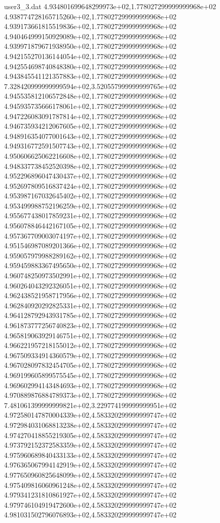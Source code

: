 \begin{filecontents}{user3_3.dat}
4.934801699648299973e+02,1.778027299999999968e+02
4.938774728165715260e+02,1.778027299999999968e+02
4.939173661815519836e+02,1.778027299999999968e+02
4.940464999150929089e+02,1.778027299999999968e+02
4.939971879671938950e+02,1.778027299999999968e+02
4.942155270136144054e+02,1.778027299999999968e+02
4.942554698740848380e+02,1.778027299999999968e+02
4.943845541121357883e+02,1.778027299999999968e+02
7.328420999999999594e+02,3.520557999999999765e+02
4.945535812106572848e+02,1.778027299999999968e+02
4.945935735666178061e+02,1.778027299999999968e+02
4.947226083091787814e+02,1.778027299999999968e+02
4.946735934212067605e+02,1.778027299999999968e+02
4.948916354077001643e+02,1.778027299999999968e+02
4.949316772591507743e+02,1.778027299999999968e+02
4.950606625062216608e+02,1.778027299999999968e+02
4.948337738452520398e+02,1.778027299999999968e+02
4.952296896047430437e+02,1.778027299999999968e+02
4.952697809516837424e+02,1.778027299999999968e+02
4.953987167032645402e+02,1.778027299999999968e+02
4.953499988752196259e+02,1.778027299999999968e+02
4.955677438017859231e+02,1.778027299999999968e+02
4.956078846442167105e+02,1.778027299999999968e+02
4.957367709003074197e+02,1.778027299999999968e+02
4.951546987089201366e+02,1.778027299999999968e+02
4.959057979988289162e+02,1.778027299999999968e+02
4.959459883367495650e+02,1.778027299999999968e+02
4.960748250973502991e+02,1.778027299999999968e+02
4.960264043292326051e+02,1.778027299999999968e+02
4.962438521958717956e+02,1.778027299999999968e+02
4.962840920292825331e+02,1.778027299999999968e+02
4.964128792943931785e+02,1.778027299999999968e+02
4.961873777256740823e+02,1.778027299999999968e+02
4.965819063929146751e+02,1.778027299999999968e+02
4.966221957218155012e+02,1.778027299999999968e+02
4.967509334914360579e+02,1.778027299999999968e+02
4.967028097832454705e+02,1.778027299999999968e+02
4.969199605899575545e+02,1.778027299999999968e+02
4.969602994143484693e+02,1.778027299999999968e+02
4.970889876884789373e+02,1.778027299999999968e+02
7.481061399999999821e+02,3.229774199999999951e+02
4.972580147870004339e+02,4.583320299999999747e+02
4.972984031068813238e+02,4.583320299999999747e+02
4.974270418855219305e+02,4.583320299999999747e+02
4.973792152372583359e+02,4.583320299999999747e+02
4.975960689840433133e+02,4.583320299999999747e+02
4.976365067994142919e+02,4.583320299999999747e+02
4.977650960825648099e+02,4.583320299999999747e+02
4.975409816060961248e+02,4.583320299999999747e+02
4.979341231810861927e+02,4.583320299999999747e+02
4.979746104919472600e+02,4.583320299999999747e+02
4.981031502796076893e+02,4.583320299999999747e+02

\end{filecontents}
